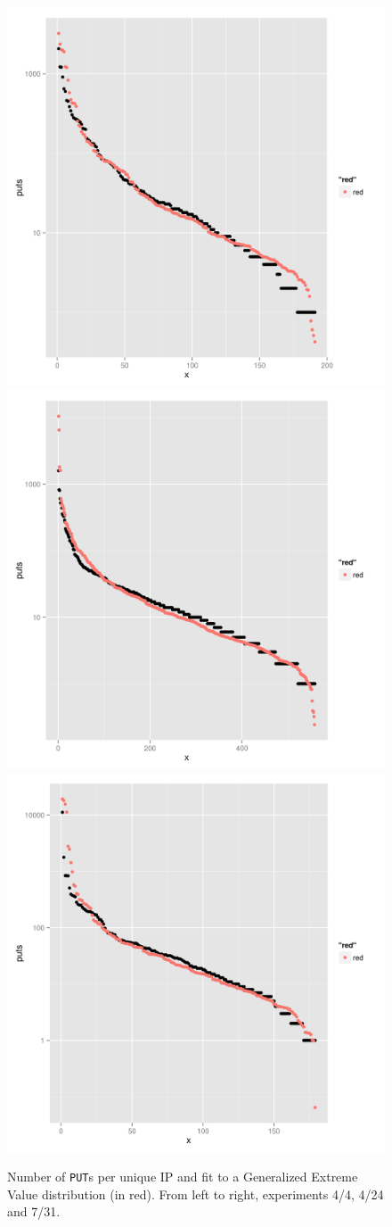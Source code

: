 \documentclass[journal,onecolumn]{IEEEtran}
\begin{document}
\begin{figure}[!htb]
\centering
\includegraphics[width=0.32\linewidth]{img/puts-openshift-4-4.png}
\includegraphics[width=0.32\linewidth]{img/puts-openshift-4-24.png}
\includegraphics[width=0.32\linewidth]{img/puts-openshift-7-31.png}
\caption{Number of {\tt PUT}s per unique IP and fit to a Generalized
  Extreme Value distribution (in red). From left to right, experiments
  4/4, 4/24 and 7/31.} 
\label{fig:puts:os}
\end{figure}
%
\end{document}
